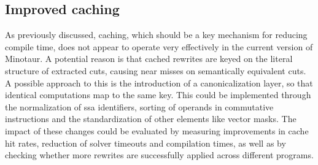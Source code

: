 	\subsection{Improved caching}

	As previously discussed, caching, which should be a key mechanism for reducing compile time, does not appear to operate very effectively in the current version of Minotaur.
	A potential reason is that cached rewrites are keyed on the literal structure of extracted cuts, causing near misses on semantically equivalent cuts.
	A possible approach to this is the introduction of a canonicalization layer, so that identical computations map to the same key.
	This could be implemented through the normalization of \gls*{ssa} identifiers, sorting of operands in commutative instructions and the standardization of other elements like vector masks.
	The impact of these changes could be evaluated by measuring improvements in cache hit rates, reduction of solver timeouts and compilation times, as well as by checking whether more rewrites are successfully applied across different programs.

